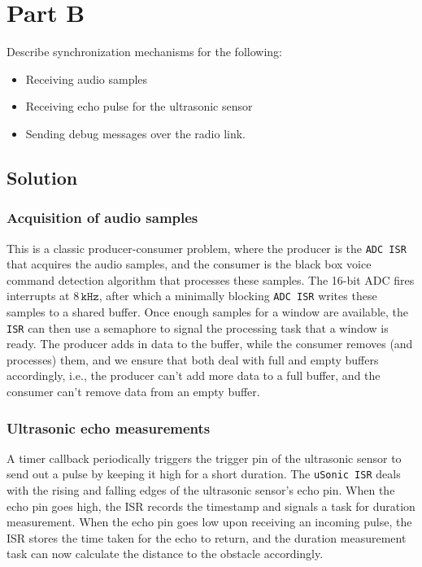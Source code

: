 \section*{Part B}

Describe synchronization mechanisms for the following:
\begin{itemize}[noitemsep, topsep=0pt]
    \item Receiving audio samples
    \item Receiving echo pulse for the ultrasonic sensor
    \item Sending debug messages over the radio link.
\end{itemize}

\subsection*{Solution}

\subsubsection*{Acquisition of audio samples}

This is a classic producer-consumer problem, where the producer is the \texttt{ADC ISR} that acquires the audio samples, and the consumer is the black box voice command detection algorithm that processes these samples.
The 16-bit ADC fires interrupts at \( 8\,\texttt{kHz} \), after which a minimally blocking \texttt{ADC ISR} writes these samples to a shared buffer.
Once enough samples for a window are available, the \texttt{ISR} can then use a semaphore to signal the processing task that a window is ready.
The producer adds in data to the buffer, while the consumer removes (and processes) them, and we ensure that both deal with full and empty buffers accordingly, i.e., the producer can't add more data to a full buffer, and the consumer can't remove data from an empty buffer.

\subsubsection*{Ultrasonic echo measurements}

A timer callback periodically triggers the trigger pin of the ultrasonic sensor to send out a pulse by keeping it high for a short duration.
The \texttt{uSonic ISR} deals with the rising and falling edges of the ultrasonic sensor's echo pin.
When the echo pin goes high, the ISR records the timestamp and signals a task for duration measurement.
When the echo pin goes low upon receiving an incoming pulse, the ISR stores the time taken for the echo to return, and the duration measurement task can now calculate the distance to the obstacle accordingly.

